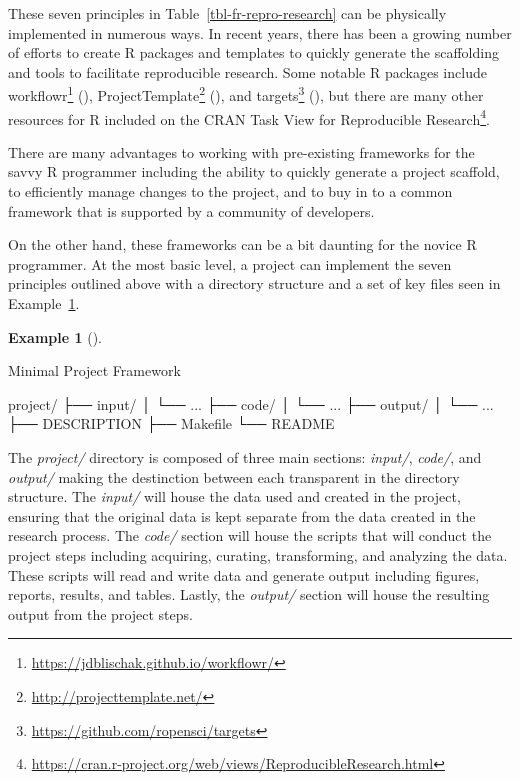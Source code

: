 \documentclass[
  letterpaper,
]{latex/krantz}
\newenvironment{Shaded}{\begin{snugshade}}{\end{snugshade}}
\newcommand{\ExtensionTok}[1]{\textcolor[rgb]{0.00,0.00,0.00}{#1}}
\newcommand{\NormalTok}[1]{\textcolor[rgb]{0.00,0.00,0.00}{#1}}
\theoremstyle{definition}
\newtheorem{example}{Example}[chapter]
\theoremstyle{remark}
\DeclareRobustCommand{\href}[2]{#2\footnote{\url{#1}}}
\begin{document}
These seven principles in Table~\ref{tbl-fr-repro-research} can be
physically implemented in numerous ways. In recent years, there has been
a growing number of efforts to create R packages and templates to
quickly generate the scaffolding and tools to facilitate reproducible
research. Some notable R packages include
\href{https://jdblischak.github.io/workflowr/}{workflowr}
(),
\href{http://projecttemplate.net/}{ProjectTemplate}
(), and
\href{https://github.com/ropensci/targets}{targets}
(), but there are many other
resources for R included on the
\href{https://cran.r-project.org/web/views/ReproducibleResearch.html}{CRAN
Task View for Reproducible Research}.

There are many advantages to working with pre-existing frameworks for
the savvy R programmer including the ability to quickly generate a
project scaffold, to efficiently manage changes to the project, and to
buy in to a common framework that is supported by a community of
developers.

On the other hand, these frameworks can be a bit daunting for the novice
R programmer. At the most basic level, a project can implement the seven
principles outlined above with a directory structure and a set of key
files seen in Example~\ref{exm-fr-basic-project}.

\begin{example}[]\protect\hypertarget{exm-fr-basic-project}{}\label{exm-fr-basic-project}

Minimal Project Framework

\begin{Shaded}
\begin{Highlighting}[]
\ExtensionTok{project/}
\ExtensionTok{├──}\NormalTok{ input/}
\ExtensionTok{│}\NormalTok{   └── ...}
\ExtensionTok{├──}\NormalTok{ code/}
\ExtensionTok{│}\NormalTok{   └── ...}
\ExtensionTok{├──}\NormalTok{ output/}
\ExtensionTok{│}\NormalTok{   └── ...}
\ExtensionTok{├──}\NormalTok{ DESCRIPTION}
\ExtensionTok{├──}\NormalTok{ Makefile}
\ExtensionTok{└──}\NormalTok{ README}
\end{Highlighting}
\end{Shaded}

\end{example}

The \emph{project/} directory is composed of three main sections:
\emph{input/}, \emph{code/}, and \emph{output/} making the destinction
between each transparent in the directory structure. The \emph{input/}
will house the data used and created in the project, ensuring that the
original data is kept separate from the data created in the research
process. The \emph{code/} section will house the scripts that will
conduct the project steps including acquiring, curating, transforming,
and analyzing the data. These scripts will read and write data and
generate output including figures, reports, results, and tables. Lastly,
the \emph{output/} section will house the resulting output from the
project steps.
\end{document}
